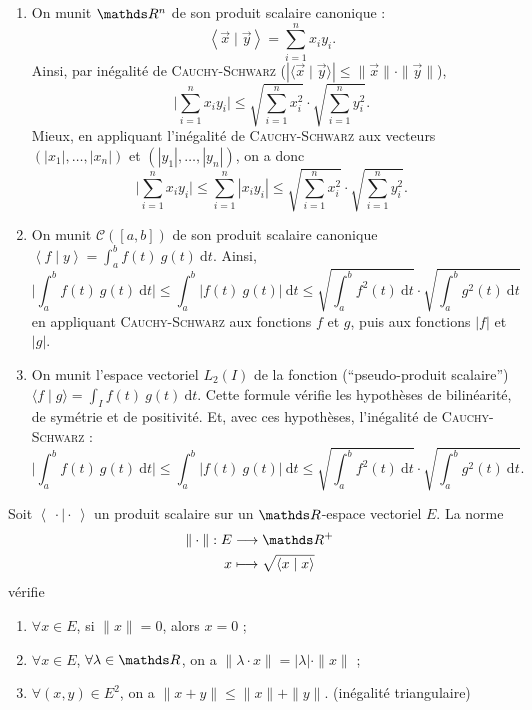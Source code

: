 \begin{exm}
	\begin{enumerate}
		\item On munit $\R^n$\/ de son produit scalaire canonique : \[
			\left<\vec{x} \mid \vec{y} \right> = \sum_{i=1}^n x_i y_i
		.\] Ainsi, par inégalité de \textsc{Cauchy}-\textsc{Schwarz} ($|\langle \vec{x}  \mid \vec{y}\rangle| \le \|\vec{x}\| \cdot \|\vec{y}\|$), \[
					\Big|\sum_{i=1}^n x_i y_i \Big| \le \sqrt{\sum_{i=1}^n x_i^2}  \cdot \sqrt{\sum_{i=1}^n y_i^2} 
				.\] Mieux, en appliquant l'inégalité de \textsc{Cauchy}-\textsc{Schwarz} aux vecteurs $(|x_1|,\ldots,|x_n|)$\/ et $(|y_1|, \ldots, |y_n|)$, on a donc \[
					\Big|\sum_{i=1}^n x_i y_i \Big| \le \sum_{i=1}^n |x_i y_i| \le \sqrt{\sum_{i=1}^n x_i^2}  \cdot \sqrt{\sum_{i=1}^n y_i^2} 
				.\] 
			\item On munit $\mathcal{C}([a,b])$\/ de son produit scalaire canonique $\left<f  \mid y \right> = \int_{a}^{b} f(t)\:g(t)~\mathrm{d}t$. Ainsi, \[
				\Big| \int_{a}^{b} f(t)\:g(t)~\mathrm{d}t \Big| \le \int_{a}^{b} |f(t)\:g(t)|~\mathrm{d}t \le \sqrt{\int_{a}^{b} f^2(t)~\mathrm{d}t} \cdot \sqrt{\int_{a}^{b} g^2(t)~\mathrm{d}t}
			\] en appliquant \textsc{Cauchy}-\textsc{Schwarz} aux fonctions $f$\/ et $g$, puis aux fonctions $|f|$\/ et $|g|$.
		\item On munit l'espace vectoriel $L_2(I)$\/ de la fonction (``pseudo-produit scalaire'') $\langle f  \mid g \rangle = \int_{I} f(t)\:g(t)~\mathrm{d}t$. Cette formule vérifie les hypothèses de bilinéarité, de symétrie et de positivité. Et, avec ces hypothèses, l'inégalité de \textsc{Cauchy}-\textsc{Schwarz} : \[
				\Big| \int_{a}^{b} f(t)\:g(t)~\mathrm{d}t \Big| \le \int_{a}^{b} |f(t)\:g(t)|~\mathrm{d}t \le \sqrt{\int_{a}^{b} f^2(t)~\mathrm{d}t} \cdot \sqrt{\int_{a}^{b} g^2(t)~\mathrm{d}t}
			.\]
	\end{enumerate}
\end{exm}

\begin{crlr}
	Soit $\left<\:\cdot  \mid \cdot \: \right>$\/ un produit scalaire sur un $\R$-espace vectoriel $E$. La norme \begin{align*}
		\|\cdot \|: E &\longrightarrow \R^+ \\
		x &\longmapsto \sqrt{\langle x  \mid x \rangle} 
	\end{align*}
	vérifie
	\begin{enumerate}
		\item $\forall x \in E$, si $\|x\| = 0$, alors $x = 0$ ;
		\item $\forall x \in E$, $\forall \lambda \in \R$, on a $\|\lambda\cdot x\| = |\lambda| \cdot \|x\|$\/ ;
		\item $\forall (x,y) \in E^2$, on a $\|x + y\|\le \|x\| + \|y\|$. \hfill (inégalité triangulaire)
	\end{enumerate}
\end{crlr}

